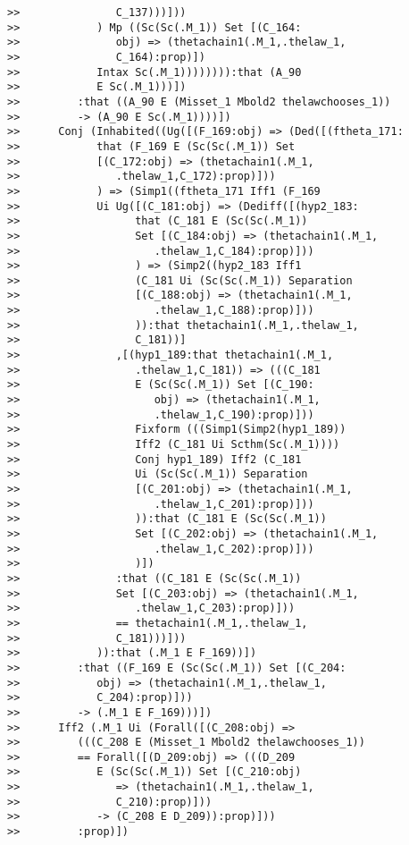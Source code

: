 \documentclass[12pt]{article}
\begin{document}
\begin{verbatim}
>>               C_137)))]))
>>            ) Mp ((Sc(Sc(.M_1)) Set [(C_164:
>>               obj) => (thetachain1(.M_1,.thelaw_1,
>>               C_164):prop)])
>>            Intax Sc(.M_1)))))))):that (A_90
>>            E Sc(.M_1)))])
>>         :that ((A_90 E (Misset_1 Mbold2 thelawchooses_1))
>>         -> (A_90 E Sc(.M_1))))])
>>      Conj (Inhabited((Ug([(F_169:obj) => (Ded([(ftheta_171:
>>            that (F_169 E (Sc(Sc(.M_1)) Set
>>            [(C_172:obj) => (thetachain1(.M_1,
>>               .thelaw_1,C_172):prop)]))
>>            ) => (Simp1((ftheta_171 Iff1 (F_169
>>            Ui Ug([(C_181:obj) => (Dediff([(hyp2_183:
>>                  that (C_181 E (Sc(Sc(.M_1))
>>                  Set [(C_184:obj) => (thetachain1(.M_1,
>>                     .thelaw_1,C_184):prop)]))
>>                  ) => (Simp2((hyp2_183 Iff1
>>                  (C_181 Ui (Sc(Sc(.M_1)) Separation
>>                  [(C_188:obj) => (thetachain1(.M_1,
>>                     .thelaw_1,C_188):prop)]))
>>                  )):that thetachain1(.M_1,.thelaw_1,
>>                  C_181))]
>>               ,[(hyp1_189:that thetachain1(.M_1,
>>                  .thelaw_1,C_181)) => (((C_181
>>                  E (Sc(Sc(.M_1)) Set [(C_190:
>>                     obj) => (thetachain1(.M_1,
>>                     .thelaw_1,C_190):prop)]))
>>                  Fixform (((Simp1(Simp2(hyp1_189))
>>                  Iff2 (C_181 Ui Scthm(Sc(.M_1))))
>>                  Conj hyp1_189) Iff2 (C_181
>>                  Ui (Sc(Sc(.M_1)) Separation
>>                  [(C_201:obj) => (thetachain1(.M_1,
>>                     .thelaw_1,C_201):prop)]))
>>                  )):that (C_181 E (Sc(Sc(.M_1))
>>                  Set [(C_202:obj) => (thetachain1(.M_1,
>>                     .thelaw_1,C_202):prop)]))
>>                  )])
>>               :that ((C_181 E (Sc(Sc(.M_1))
>>               Set [(C_203:obj) => (thetachain1(.M_1,
>>                  .thelaw_1,C_203):prop)]))
>>               == thetachain1(.M_1,.thelaw_1,
>>               C_181)))]))
>>            )):that (.M_1 E F_169))])
>>         :that ((F_169 E (Sc(Sc(.M_1)) Set [(C_204:
>>            obj) => (thetachain1(.M_1,.thelaw_1,
>>            C_204):prop)]))
>>         -> (.M_1 E F_169)))])
>>      Iff2 (.M_1 Ui (Forall([(C_208:obj) =>
>>         (((C_208 E (Misset_1 Mbold2 thelawchooses_1))
>>         == Forall([(D_209:obj) => (((D_209
>>            E (Sc(Sc(.M_1)) Set [(C_210:obj)
>>               => (thetachain1(.M_1,.thelaw_1,
>>               C_210):prop)]))
>>            -> (C_208 E D_209)):prop)]))
>>         :prop)])

\end{verbatim}
\end{document}
